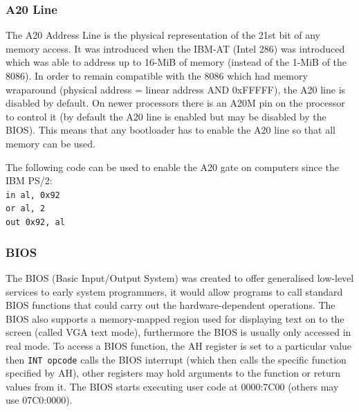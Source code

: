 \documentclass{article}
\newcommand{\layout}[1]{\parbox{\linewidth}{#1}}
\begin{document}
\layout{
  \subsubsection{A20 Line}

  The A20 Address Line is the physical representation of the 21st bit of any memory access.
  It was introduced when the IBM-AT (Intel 286) was introduced which was able to address up to 16-MiB of memory (instead of the 1-MiB of the 8086).
  In order to remain compatible with the 8086 which had memory wraparound (physical address = linear address AND 0xFFFFF), the A20 line is disabled by default.
  On newer processors there is an A20M pin on the processor to control it (by default the A20 line is enabled but may be disabled by the BIOS).
  This means that any bootloader has to enable the A20 line so that all memory can be used.

  \bigskip

  The following code can be used to enable the A20 gate on computers since the IBM PS/2: \\
  \texttt{in al, 0x92} \\
  \texttt{or al, 2} \\
  \texttt{out 0x92, al}

  \bigskip \cite{osdev-a20}
}

\layout{
  \subsubsection{BIOS}

  The BIOS (Basic Input/Output System) was created to offer generalised low-level services to early system programmers, it would allow programs to call standard BIOS functions that could carry out the hardware-dependent operations.
  The BIOS also supports a memory-mapped region used for displaying text on to the screen (called VGA text mode), furthermore the BIOS is usually only accessed in real mode.
  To access a BIOS function, the AH register is set to a particular value then \texttt{INT opcode} calls the BIOS interrupt (which then calls the specific function specified by AH), other registers may hold arguments to the function or return values from it.
  The BIOS starts executing user code at 0000:7C00 (others may use 07C0:0000).

  \bigskip \cite{bios}
}

%
%
\end{document}
